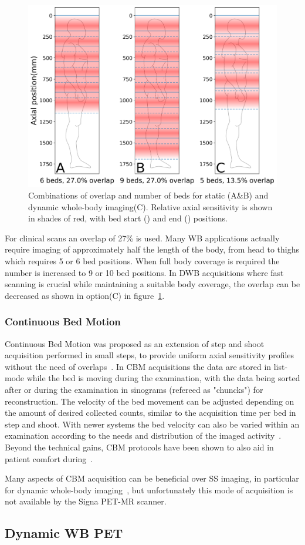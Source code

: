 \begin{figure} [ht!]
\centering
\includegraphics[scale=0.5,angle=0]{3_Results/3_1_DWB_Optimization/figures/SensitivityProfiles_overHuman.png}
\caption{Combinations of overlap and number of beds for static (A\&B) and dynamic whole-body imaging(C). Relative axial sensitivity is shown in shades of red, with bed start (\protect{}) and end (\protect{}) positions.} 
\label{fig3_1:BodyCoverage}
\end{figure}
%
For clinical scans an overlap of 27\% is used. Many WB applications actually require imaging of approximately half the length of the body, from head to thighs which requires 5 or 6 bed positions. When full body coverage is required the number is increased to 9 or 10 bed positions. In DWB acquisitions where fast scanning is crucial while maintaining a suitable body coverage, the overlap can be decreased as shown in option(C) in figure~\ref{fig3_1:BodyCoverage}. 

\subsubsection{Continuous Bed Motion}
Continuous Bed Motion was proposed as an extension of step and shoot acquisition performed in small steps, to provide uniform axial sensitivity profiles without the need of overlaps~\cite{Dahlbom2001,Brasse2002}. In CBM acquisitions the data are stored in list-mode while the bed is moving during the examination, with the data being sorted after or during the examination in sinograms (refereed as "chuncks") for reconstruction. The velocity of the bed movement can be adjusted depending on the amount of desired collected counts, similar to the acquisition time per bed in step and shoot. With newer systems the bed velocity can also be varied within an examination according to the needs and distribution of the imaged activity~\cite{Panin2014}. Beyond the technical gains, CBM protocols have been shown to also aid in patient comfort during~\cite{Schatka2016}. 

Many aspects of CBM acquisition can be beneficial over SS imaging, in particular for dynamic whole-body imaging~\cite{Karakatsanis2016}, but unfortunately this mode of acquisition is not available by the Signa PET-MR scanner.

\subsection{Dynamic WB PET}
